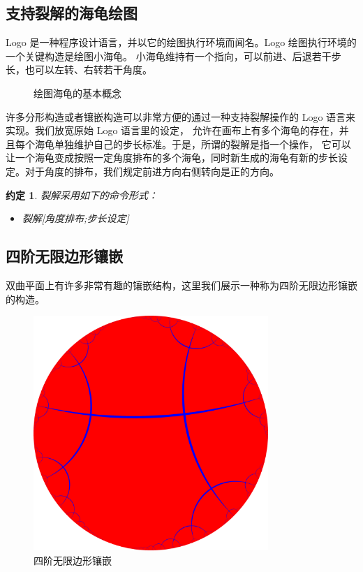 \documentclass[a4paper,12pt]{article}
\newtheorem{convention}{约定}
\begin{document}
\subsection{支持裂解的海龟绘图}

Logo 是一种程序设计语言，并以它的绘图执行环境而闻名。Logo 绘图执行环境的一个关键构造是绘图小海龟。
小海龟维持有一个指向，可以前进、后退若干步长，也可以左转、右转若干角度。

\begin{figure}[ht]
\centering
{}
\caption{绘图海龟的基本概念}
\end{figure}

许多分形构造或者镶嵌构造可以非常方便的通过一种支持裂解操作的 Logo 语言来实现。我们放宽原始 Logo 语言里的设定，
允许在画布上有多个海龟的存在，并且每个海龟单独维护自己的步长标准。于是，所谓的裂解是指一个操作，
它可以让一个海龟变成按照一定角度排布的多个海龟，同时新生成的海龟有新的步长设定。对于角度的排布，我们规定前进方向右侧转向是正的方向。

\begin{convention}
裂解采用如下的命令形式：
\begin{itemize}
\item 裂解[角度排布;步长设定]
\end{itemize}
\end{convention}

\subsection{四阶无限边形镶嵌}

双曲平面上有许多非常有趣的镶嵌结构，这里我们展示一种称为四阶无限边形镶嵌的构造。

\begin{figure}[ht]
\centering
\includegraphics[width=3.5in]{images/H2_tiling_24i-1.png}
\caption{四阶无限边形镶嵌}
\end{figure}
\end{document}
